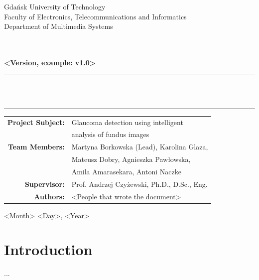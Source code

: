 \documentclass[12pt, a4paper]{article}
\begin{document}
\begin{titlepage}
  \centering
  \vspace*{2cm}

  {\large Gdańsk University of Technology\\
  Faculty of Electronics, Telecommunications and Informatics\\
  Department of Multimedia Systems}

  \vspace{1.5cm}
  {\Large\bfseries <Type of documentation>}\\[0.4cm]
  {\Large\bfseries <Which Project Sector>}\\[0.4cm]
  {\bfseries <Version, example: v1.0>}
  
  \vspace{1.5cm}
  \rule{\linewidth}{0.5pt}\\[0.4cm]
  {\LARGE\bfseries <Raport Tittle>}\\[0.3cm]
  \rule{\linewidth}{0.5pt}

  \vspace{1.5cm}
  \begin{tabular}{rl}
    \textbf{Project Subject:}    & Glaucoma detection using intelligent \\
                                 & analysis of fundus images \\[6pt]                 
    \textbf{Team Members:}       & Martyna Borkowska (Lead), Karolina Glaza, \\
                                 & Mateusz Dobry, Agnieszka Pawłowska, \\
                                 & Amila Amarasekara, Antoni Naczke \\[6pt]
    \textbf{Supervisor:}         & Prof. Andrzej Czyżewski, Ph.D., D.Sc., Eng. \\[24pt]

    \textbf{Authors:}             & <People that wrote the document> \\[6pt]    
    
  \end{tabular}

  \vfill
  {\large <Month> <Day>, <Year>}
\end{titlepage}

\newpage
\tableofcontents
\newpage

\section{Introduction}
...
\end{document}
